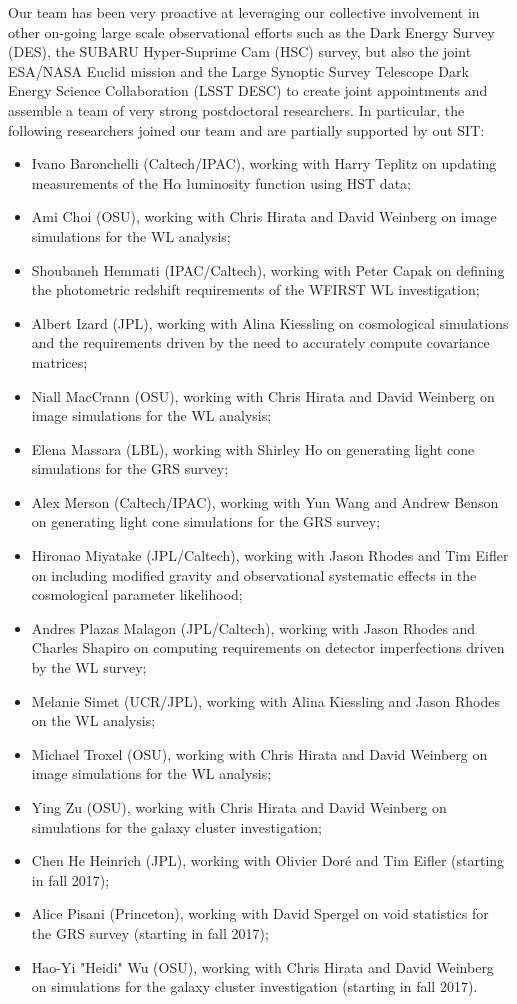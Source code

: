 Our team has been very proactive at leveraging our collective involvement in other on-going large scale observational efforts such as the Dark Energy Survey (DES), the SUBARU Hyper-Suprime Cam (HSC) survey, but also the joint ESA/NASA Euclid mission and the Large Synoptic Survey Telescope Dark Energy Science Collaboration (LSST DESC) to create joint appointments and assemble a team of very strong postdoctoral researchers. In particular, the following researchers joined our team and are partially supported by out SIT:
\begin{itemize}
\item Ivano Baronchelli (Caltech/IPAC), working with Harry Teplitz on updating measurements of the H$\alpha$ luminosity function using HST data;
\item Ami Choi (OSU), working with Chris Hirata and David Weinberg on image simulations for the WL analysis;
\item Shoubaneh Hemmati (IPAC/Caltech), working with Peter Capak on defining the photometric redshift requirements of the WFIRST WL investigation;
\item Albert Izard (JPL), working with Alina Kiessling on cosmological simulations and the requirements driven by the need to accurately compute covariance matrices;
\item Niall MacCrann (OSU), working with Chris Hirata and David Weinberg on image simulations for the WL analysis;
\item Elena Massara (LBL), working with Shirley Ho on generating light cone simulations for the GRS survey;
\item Alex Merson (Caltech/IPAC), working with Yun Wang and Andrew Benson on generating light cone simulations for the GRS survey;
\item Hironao Miyatake (JPL/Caltech), working with Jason Rhodes and Tim Eifler on including modified gravity and observational systematic effects in the cosmological parameter likelihood;
\item Andres Plazas Malagon (JPL/Caltech), working with Jason Rhodes and Charles Shapiro on computing requirements on detector imperfections driven by the WL survey;
\item Melanie Simet (UCR/JPL), working with Alina Kiessling and Jason Rhodes on the WL analysis;
\item Michael Troxel (OSU), working with Chris Hirata and David Weinberg on image simulations for the WL analysis;
\item Ying Zu (OSU), working with Chris Hirata and David Weinberg on simulations for the galaxy cluster investigation;
\item Chen He Heinrich (JPL), working with Olivier Dor\'e and Tim Eifler (starting in fall 2017);
\item Alice Pisani (Princeton), working with David Spergel on void statistics for the GRS survey (starting in fall 2017);
\item Hao-Yi "Heidi" Wu (OSU), working with Chris Hirata and David Weinberg on simulations for the galaxy cluster investigation (starting in fall 2017).
\end{itemize}

